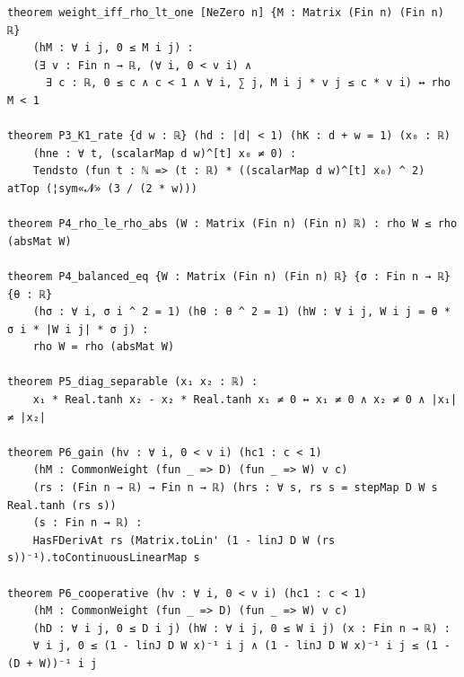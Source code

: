 \begin{Verbatim}[fontsize=\footnotesize,formatcom=\leanfont,commandchars=¦«»]
theorem weight_iff_rho_lt_one [NeZero n] {M : Matrix (Fin n) (Fin n) ℝ}
    (hM : ∀ i j, 0 ≤ M i j) :
    (∃ v : Fin n → ℝ, (∀ i, 0 < v i) ∧
      ∃ c : ℝ, 0 ≤ c ∧ c < 1 ∧ ∀ i, ∑ j, M i j * v j ≤ c * v i) ↔ rho M < 1

theorem P3_K1_rate {d w : ℝ} (hd : |d| < 1) (hK : d + w = 1) (x₀ : ℝ)
    (hne : ∀ t, (scalarMap d w)^[t] x₀ ≠ 0) :
    Tendsto (fun t : ℕ => (t : ℝ) * ((scalarMap d w)^[t] x₀) ^ 2) atTop (¦sym«𝓝» (3 / (2 * w)))

theorem P4_rho_le_rho_abs (W : Matrix (Fin n) (Fin n) ℝ) : rho W ≤ rho (absMat W)

theorem P4_balanced_eq {W : Matrix (Fin n) (Fin n) ℝ} {σ : Fin n → ℝ} {θ : ℝ}
    (hσ : ∀ i, σ i ^ 2 = 1) (hθ : θ ^ 2 = 1) (hW : ∀ i j, W i j = θ * σ i * |W i j| * σ j) :
    rho W = rho (absMat W)

theorem P5_diag_separable (x₁ x₂ : ℝ) :
    x₁ * Real.tanh x₂ - x₂ * Real.tanh x₁ ≠ 0 ↔ x₁ ≠ 0 ∧ x₂ ≠ 0 ∧ |x₁| ≠ |x₂|

theorem P6_gain (hv : ∀ i, 0 < v i) (hc1 : c < 1)
    (hM : CommonWeight (fun _ => D) (fun _ => W) v c)
    (rs : (Fin n → ℝ) → Fin n → ℝ) (hrs : ∀ s, rs s = stepMap D W s Real.tanh (rs s))
    (s : Fin n → ℝ) :
    HasFDerivAt rs (Matrix.toLin' (1 - linJ D W (rs s))⁻¹).toContinuousLinearMap s

theorem P6_cooperative (hv : ∀ i, 0 < v i) (hc1 : c < 1)
    (hM : CommonWeight (fun _ => D) (fun _ => W) v c)
    (hD : ∀ i j, 0 ≤ D i j) (hW : ∀ i j, 0 ≤ W i j) (x : Fin n → ℝ) :
    ∀ i j, 0 ≤ (1 - linJ D W x)⁻¹ i j ∧ (1 - linJ D W x)⁻¹ i j ≤ (1 - (D + W))⁻¹ i j
\end{Verbatim}
